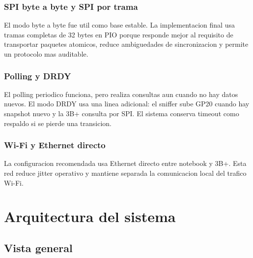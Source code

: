 \documentclass[12pt,a4paper,oneside]{report}
\begin{document}
\subsection{SPI byte a byte y SPI por trama}

El modo byte a byte fue util como base estable. La implementacion final usa
tramas completas de 32 bytes en PIO porque responde mejor al requisito de
transportar paquetes atomicos, reduce ambiguedades de sincronizacion y permite
un protocolo mas auditable.

\subsection{Polling y DRDY}

El polling periodico funciona, pero realiza consultas aun cuando no hay datos
nuevos. El modo DRDY usa una linea adicional: el sniffer sube GP20 cuando hay
snapshot nuevo y la 3B+ consulta por SPI. El sistema conserva timeout como
respaldo si se pierde una transicion.

\subsection{Wi-Fi y Ethernet directo}

La configuracion recomendada usa Ethernet directo entre notebook y 3B+. Esta
red reduce jitter operativo y mantiene separada la comunicacion local del
trafico Wi-Fi.

\chapter{Arquitectura del sistema}

\section{Vista general}
\end{document}

